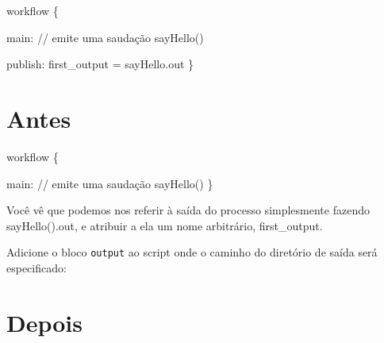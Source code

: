 \documentclass[
  brazilian,
  letterpaper,
  DIV=11,
  numbers=noendperiod]{scrreprt}
\newenvironment{Shaded}{\begin{snugshade}}{\end{snugshade}}
\newcommand{\CommentTok}[1]{\textcolor[rgb]{0.37,0.37,0.37}{#1}}
\newcommand{\FunctionTok}[1]{\textcolor[rgb]{0.28,0.35,0.67}{#1}}
\newcommand{\NormalTok}[1]{\textcolor[rgb]{0.00,0.23,0.31}{#1}}
\newcommand{\OperatorTok}[1]{\textcolor[rgb]{0.37,0.37,0.37}{#1}}
\begin{document}
\begin{Shaded}
\begin{Highlighting}[]
\NormalTok{workflow }\OperatorTok{\{}

\NormalTok{    main}\OperatorTok{:}
    \CommentTok{// emite uma saudação}
    \FunctionTok{sayHello}\OperatorTok{()}

\NormalTok{    publish}\OperatorTok{:}
\NormalTok{    first\_output }\OperatorTok{=}\NormalTok{ sayHello}\OperatorTok{.}\NormalTok{out}
\OperatorTok{\}}
\end{Highlighting}
\end{Shaded}

\section{Antes}

\begin{Shaded}
\begin{Highlighting}[]
\NormalTok{workflow }\OperatorTok{\{}

\NormalTok{    main}\OperatorTok{:}
    \CommentTok{// emite uma saudação}
    \FunctionTok{sayHello}\OperatorTok{()}
\OperatorTok{\}}
\end{Highlighting}
\end{Shaded}

\begin{tcolorbox}[enhanced jigsaw, arc=.35mm, bottomrule=.15mm, bottomtitle=1mm, breakable, colback=white, colbacktitle=quarto-callout-note-color!10!white, colframe=quarto-callout-note-color-frame, coltitle=black, left=2mm, leftrule=.75mm, opacityback=0, opacitybacktitle=0.6, rightrule=.15mm, title=\textcolor{quarto-callout-note-color}{\faInfo}\hspace{0.5em}{Nota}, titlerule=0mm, toprule=.15mm, toptitle=1mm]

Você vê que podemos nos referir à saída do processo simplesmente fazendo
sayHello().out, e atribuir a ela um nome arbitrário, first\_output.

\end{tcolorbox}

Adicione o bloco \texttt{output} ao script onde o caminho do diretório
de saída será especificado:

\section{Depois}
\end{document}
